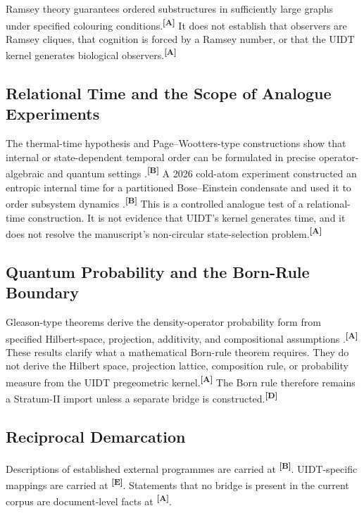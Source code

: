\documentclass[12pt,a4paper,twoside]{article}
\theoremstyle{plain}
\theoremstyle{definition}
\theoremstyle{remark}
\newcommand{\catmark}[1]{\textsuperscript{\textsf{\textbf{[#1]}}}}
\begin{document}
Ramsey theory guarantees ordered substructures in sufficiently large graphs
under specified colouring conditions.\catmark{A} It does not establish that
observers are Ramsey cliques, that cognition is forced by a Ramsey number, or
that the UIDT kernel generates biological observers.\catmark{A}

\subsection{Relational Time and the Scope of Analogue Experiments}
\label{subsec:ctx-relational-time}

The thermal-time hypothesis and Page--Wootters-type constructions show that
internal or state-dependent temporal order can be formulated in precise
operator-algebraic and quantum settings
\cite{connesrovelli1994,pagewootters1983}.\catmark{B} A 2026 cold-atom
experiment constructed an entropic internal time for a partitioned Bose--Einstein
condensate and used it to order subsystem dynamics
\cite{barontini2026}.\catmark{B} This is a controlled analogue test of a
relational-time construction. It is not evidence that UIDT's kernel generates
time, and it does not resolve the manuscript's non-circular state-selection
problem.\catmark{A}

\subsection{Quantum Probability and the Born-Rule Boundary}
\label{subsec:ctx-born-boundary}

Gleason-type theorems derive the density-operator probability form from
specified Hilbert-space, projection, additivity, and compositional assumptions
\cite{gleason1957,frembs2023,fiorentino2026}.\catmark{A} These results clarify
what a mathematical Born-rule theorem requires. They do not derive the Hilbert
space, projection lattice, composition rule, or probability measure from the
UIDT pregeometric kernel.\catmark{A} The Born rule therefore remains a
Stratum-II import unless a separate bridge is constructed.\catmark{D}

\subsection{Reciprocal Demarcation}
\label{subsec:ctx-reciprocal-demarcation}

Descriptions of established external programmes are carried at
\catmark{B}. UIDT-specific mappings are carried at \catmark{E}. Statements
that no bridge is present in the current corpus are document-level facts at
\catmark{A}.
\end{document}
